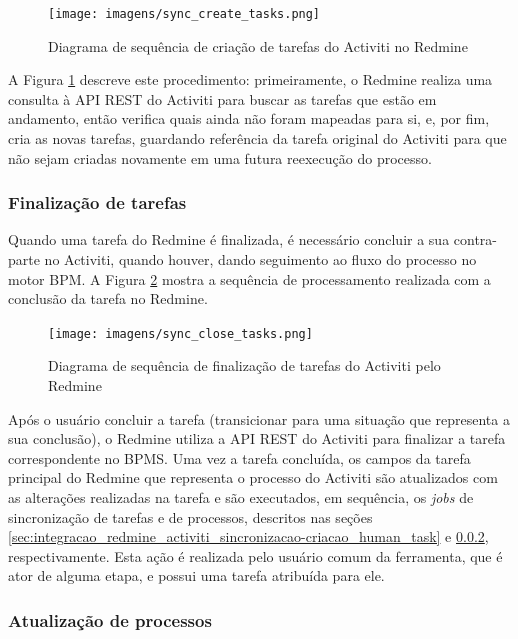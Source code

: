 \begin{figure}[H]
\centering
\texttt{[image: imagens/sync\_create\_tasks.png]}
\caption{Diagrama de sequência de criação de tarefas do Activiti no Redmine}
\label{fig:sync_bpm_tasks}
\end{figure}

A Figura \ref{fig:sync_bpm_tasks} descreve este procedimento: primeiramente, o Redmine realiza uma consulta à API REST do Activiti para buscar as tarefas que estão em andamento, então verifica quais ainda não foram mapeadas para si, e, por fim, cria as novas tarefas, guardando referência da tarefa original do Activiti para que não sejam criadas novamente em uma futura reexecução do processo.

\subsubsection{Finalização de tarefas}\label{sec:integracao_redmine_activiti_sincronizacao-finalizacao_human_task}

Quando uma tarefa do Redmine é finalizada, é necessário concluir a sua contra-parte no Activiti, quando houver, dando seguimento ao fluxo do processo no motor BPM. A Figura \ref{fig:close_bpm_tasks} mostra a sequência de processamento realizada com a conclusão da tarefa no Redmine.

\begin{figure}[H]
\centering
\texttt{[image: imagens/sync\_close\_tasks.png]}
\caption{Diagrama de sequência de finalização de tarefas do Activiti pelo Redmine}
\label{fig:close_bpm_tasks}
\end{figure}

Após o usuário concluir a tarefa (transicionar para uma situação que representa a sua conclusão), o Redmine utiliza a API REST do Activiti para finalizar a tarefa correspondente no BPMS. Uma vez a tarefa concluída, os campos da tarefa principal do Redmine que representa o processo do Activiti são atualizados com as alterações realizadas na tarefa e são executados, em sequência, os \textit{jobs} de sincronização de tarefas e de processos, descritos nas seções \ref{sec:integracao_redmine_activiti_sincronizacao-criacao_human_task} e \ref{sec:integracao_redmine_activiti_sincronizacao-status_processo}, respectivamente. Esta ação é realizada pelo usuário comum da ferramenta, que é ator de alguma etapa, e possui uma tarefa atribuída para ele.

\subsubsection{Atualização de processos}\label{sec:integracao_redmine_activiti_sincronizacao-status_processo}

